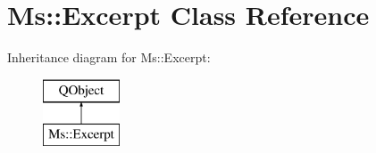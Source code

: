 \hypertarget{class_ms_1_1_excerpt}{}\section{Ms\+:\+:Excerpt Class Reference}
\label{class_ms_1_1_excerpt}
Inheritance diagram for Ms\+:\+:Excerpt\+:\begin{figure}[H]
\begin{center}
\leavevmode
\includegraphics[height=2.000000cm]{class_ms_1_1_excerpt}
\end{center}
\end{figure}
